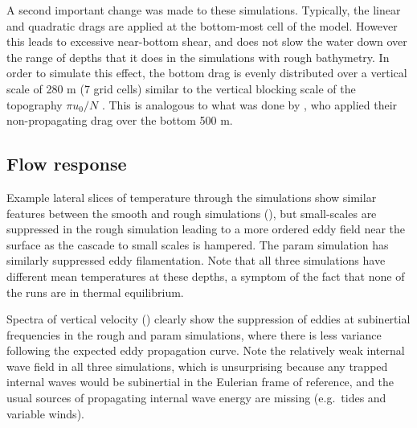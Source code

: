 \documentclass[twocol]{ametsocV5}
\begin{document}
A second important change was made to these simulations.  Typically, the linear and quadratic drags are applied at the bottom-most cell of the model.  However this leads to excessive near-bottom shear, and does not slow the water down over the range of depths that it does in the simulations with rough bathymetry.  In order to simulate this effect, the bottom drag is evenly distributed over a vertical scale of 280 m (7 grid cells) similar to the vertical blocking scale of the topography $\pi u_0/N$ \citep{klymaketal10a}.  This is analogous to what was done by \citet{trossmanetal2016}, who applied their non-propagating drag over the bottom 500 m.

\subsection{Flow response}

Example lateral slices of temperature through the simulations show similar features between the {\sc smooth} and {\sc rough} simulations (), but small-scales are suppressed in the {\sc rough} simulation leading to a more ordered eddy field near the surface as the cascade to small scales is hampered. The {\sc param} simulation has similarly suppressed eddy filamentation.  Note that all three simulations have different mean temperatures at these depths, a symptom of the fact that none of the runs are in thermal equilibrium.

Spectra of vertical velocity () clearly show the suppression of eddies at subinertial frequencies in the {\sc rough} and {\sc param} simulations, where there is less variance following the expected eddy propagation curve.  Note the relatively weak internal wave field in all three simulations, which is unsurprising because any trapped internal waves would be subinertial in the Eulerian frame of reference, and the usual sources of propagating internal wave energy are missing (e.g.\ tides and variable winds).
\end{document}
